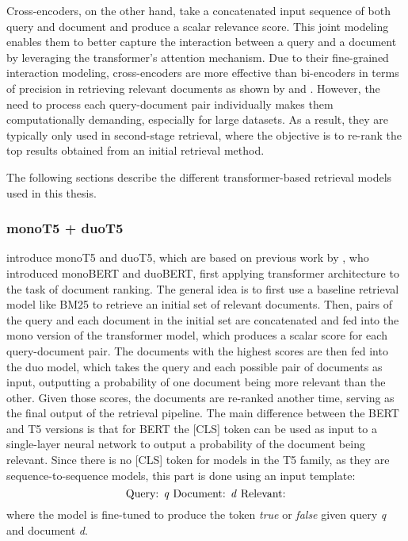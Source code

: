 Cross-encoders, on the other hand, take a concatenated input sequence of both query and document and produce a scalar relevance score.
This joint modeling enables them to better capture the interaction between a query and a document by leveraging the transformer's attention mechanism.
Due to their fine-grained interaction modeling, cross-encoders are more effective than bi-encoders in terms of precision in retrieving relevant documents as shown by \cite{thakur:2020:Augmented} and \cite{rosa:2022:In}.
However, the need to process each query-document pair individually makes them computationally demanding, especially for large datasets.
As a result, they are typically only used in second-stage retrieval, where the objective is to re-rank the top results obtained from an initial retrieval method.

The following sections describe the different transformer-based retrieval models used in this thesis.
\subsubsection{monoT5 + duoT5}\label{sec:monoT5-duoT5}
\cite{roberts:2019:Exploring} introduce monoT5 and duoT5, which are based on previous work by \cite{nogueira:2019:Multi}, who introduced monoBERT and duoBERT, first applying transformer architecture to the task of document ranking.
The general idea is to first use a baseline retrieval model like BM25 to retrieve an initial set of relevant documents.
Then, pairs of the query and each document in the initial set are concatenated and fed into the mono version of the transformer model, which produces a scalar score for each query-document pair.
The documents with the highest scores are then fed into the duo model, which takes the query and each possible pair of documents as input, outputting a probability of one document being more relevant than the other.
Given those scores, the documents are re-ranked another time, serving as the final output of the retrieval pipeline.
The main difference between the BERT and T5 versions is that for BERT the [CLS] token can be used as input to a single-layer neural network to output a probability of the document being relevant.
Since there is no [CLS] token for models in the T5 family, as they are sequence-to-sequence models, this part is done using an input template:
\begin{equation}
    \text{Query: \emph{q} Document: \emph{d} Relevant:}
\end{equation} 
where the model is fine-tuned to produce the token \emph{true} or \emph{false} given query \emph{q} and document \emph{d}.

